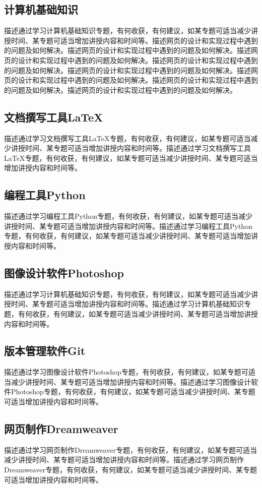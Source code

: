 \documentclass[supercite]{Experimental_Report}
\theoremstyle{definition}
\begin{document}
\subsection{计算机基础知识}

描述通过学习计算机基础知识专题，有何收获，有何建议，如某专题可适当减少讲授时间、某专题可适当增加讲授内容和时间等。描述网页的设计和实现过程中遇到的问题及如何解决。描述网页的设计和实现过程中遇到的问题及如何解决。描述网页的设计和实现过程中遇到的问题及如何解决。描述网页的设计和实现过程中遇到的问题及如何解决。描述网页的设计和实现过程中遇到的问题及如何解决。描述网页的设计和实现过程中遇到的问题及如何解决。描述网页的设计和实现过程中遇到的问题及如何解决。描述网页的设计和实现过程中遇到的问题及如何解决。

\subsection{文档撰写工具LaTeX}

描述通过学习文档撰写工具LaTeX专题，有何收获，有何建议，如某专题可适当减少讲授时间、某专题可适当增加讲授内容和时间等。描述通过学习文档撰写工具LaTeX专题，有何收获，有何建议，如某专题可适当减少讲授时间、某专题可适当增加讲授内容和时间等。

\subsection{编程工具Python}

描述通过学习编程工具Python专题，有何收获，有何建议，如某专题可适当减少讲授时间、某专题可适当增加讲授内容和时间等。描述通过学习编程工具Python专题，有何收获，有何建议，如某专题可适当减少讲授时间、某专题可适当增加讲授内容和时间等。

\subsection{图像设计软件Photoshop}

描述通过学习计算机基础知识专题，有何收获，有何建议，如某专题可适当减少讲授时间、某专题可适当增加讲授内容和时间等。描述通过学习计算机基础知识专题，有何收获，有何建议，如某专题可适当减少讲授时间、某专题可适当增加讲授内容和时间等。

\subsection{版本管理软件Git}

描述通过学习图像设计软件Photoshop专题，有何收获，有何建议，如某专题可适当减少讲授时间、某专题可适当增加讲授内容和时间等。描述通过学习图像设计软件Photoshop专题，有何收获，有何建议，如某专题可适当减少讲授时间、某专题可适当增加讲授内容和时间等。

\subsection{网页制作Dreamweaver}

描述通过学习网页制作Dreamweaver专题，有何收获，有何建议，如某专题可适当减少讲授时间、某专题可适当增加讲授内容和时间等。描述通过学习网页制作Dreamweaver专题，有何收获，有何建议，如某专题可适当减少讲授时间、某专题可适当增加讲授内容和时间等。


\nocite{*} %

%
%
\end{document}
